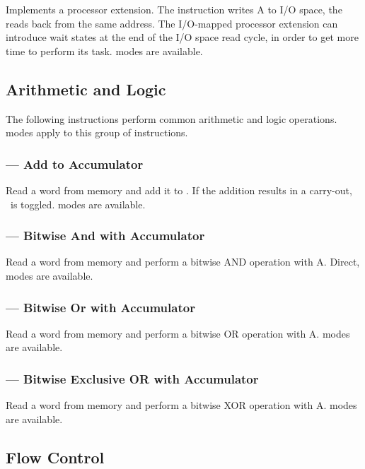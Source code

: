 Implements a processor extension. The  instruction writes A to I/O
space, the reads \A{} back from the same address. The I/O-mapped processor
extension can introduce wait states at the end of the I/O space read cycle, in
order to get more time to perform its task. \AMGroupOne modes are available.

\subsection{Arithmetic and Logic}

The following instructions perform common arithmetic and logic
operations. \AMGroupOne modes apply to this group of instructions.

\subsubsection{ — Add to Accumulator}
\label{sec:instruction-ADD}

Read a word from memory and add it to \A. If the addition results in a
carry-out, \Lreg\ is toggled. \AMGroupOne modes are available.

\subsubsection{ — Bitwise And with Accumulator}
\label{sec:instruction-AND}

Read a word from memory and perform a bitwise AND operation with A. Direct,
\AMGroupOne modes are available.

\subsubsection{ — Bitwise Or with Accumulator}
\label{sec:instruction-OR}

Read a word from memory and perform a bitwise OR operation with A. \AMGroupOne
modes are available.

\subsubsection{ — Bitwise Exclusive OR with Accumulator}
\label{sec:instruction-XOR}

Read a word from memory and perform a bitwise XOR operation with A. \AMGroupOne
modes are available.

\subsection{Flow Control}

